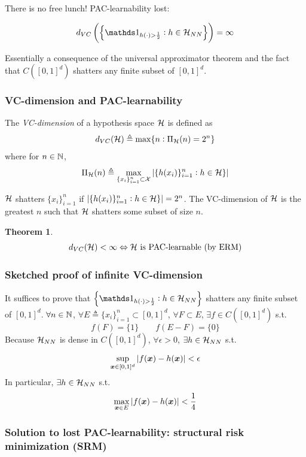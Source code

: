 \documentclass{article}
\newcommand{\ind}{{\mathds 1}}
\newtheorem{theorem}{Theorem}
\begin{document}
There is no free lunch!
PAC-learnability lost:
\begin{corollary}
\[
d_{VC} \left(\left\{\ind_{h(\cdot) > \frac12} : h \in \calh_{NN}\right\}\right) = \infty
\]
\end{corollary}
Essentially a consequence of the universal approximator theorem and the fact that $C ([0, 1]^d)$ shatters any finite subset of $[0, 1]^d$.

\subsubsection{VC-dimension and PAC-learnability}

\begin{definition}
The \emph{VC-dimension} of a hypothesis space ${\mathcal H}$ is defined as
\[
d_{VC} ({\mathcal H}) \triangleq \max \{n : \Pi_{\mathcal H} (n) = 2^n\}
\]
where for $n \in {\mathbb N}$,
\[
\Pi_{\mathcal H} (n) \triangleq \max_{\{x_i\}_{i = 1}^n \subset {\mathcal X}} |\{h(x_i)\}_{i = 1}^n : h \in {\mathcal H}\}|
\]
\end{definition}

${\mathcal H}$ shatters $\{x_i\}_{i = 1}^n$ if $|\{h(x_i)\}_{i = 1}^n : h \in {\mathcal H}\}| = 2^n$.
The VC-dimension of ${\mathcal H}$ is the greatest $n$ such that ${\mathcal H}$ shatters some subset of size $n$.

\begin{theorem}
\[
d_{VC} ({\mathcal H}) < \infty
\Leftrightarrow {\mathcal H}\ \text{is PAC-learnable (by ERM)}
\]
\end{theorem}

\subsubsection{Sketched proof of infinite VC-dimension}

It suffices to prove that $\left\{\ind_{h(\cdot) > \frac12} : h \in \calh_{NN}\right\}$ shatters any finite subset of $[0, 1]^d$.
$\forall n \in {\mathbb N}$, $\forall E \triangleq \{x_i\}_{i = 1}^n \subset [0, 1]^d$, $\forall F \subset E$, $\exists f \in C([0, 1]^d)$ s.t.
\[
f(F) = \{1\} \qquad f(E - F) = \{0\}
\]
Because ${\mathcal H}_{NN}$ is dense in $C([0, 1]^d)$, $\forall \epsilon > 0$, $\exists h \in {\mathcal H}_{NN}$ s.t.
\[
\sup_{{\bm x} \in [0, 1]^d} |f({\bm x}) - h({\bm x})| < \epsilon
\]
In particular, $\exists h \in {\mathcal H}_{NN}$ s.t.
\[
\max_{{\bm x} \in E} |f({\bm x}) - h({\bm x})| < \frac14
\]

\subsubsection{Solution to lost PAC-learnability: structural risk minimization (SRM) \cite{vapnik1992principles}}
\end{document}
